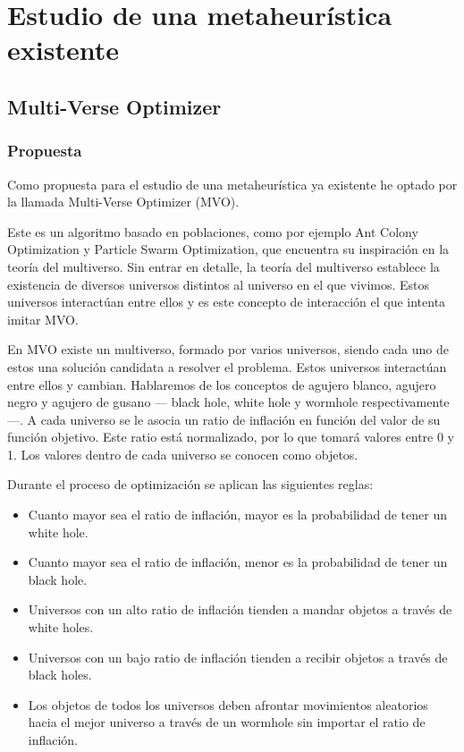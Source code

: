 \chapter{Estudio de una metaheurística existente}
\section{Multi-Verse Optimizer}
\subsection{Propuesta}
Como propuesta para el estudio de una metaheurística ya existente he optado por la llamada Multi-Verse Optimizer (MVO).

Este es un algoritmo basado en poblaciones, como por ejemplo Ant Colony Optimization y Particle Swarm Optimization, que encuentra su inspiración en la teoría del multiverso. Sin entrar en detalle, la teoría del multiverso establece la existencia de diversos universos distintos al universo en el que vivimos. Estos universos interactúan entre ellos y es este concepto de interacción el que intenta imitar MVO.

En MVO existe un multiverso, formado por varios universos, siendo cada uno de estos una solución candidata a resolver el problema. Estos universos interactúan entre ellos y cambian. Hablaremos de los conceptos de agujero blanco, agujero negro y agujero de gusano --- black hole, white hole y wormhole respectivamente---. A cada universo se le asocia un ratio de inflación en función del valor de su función objetivo. Este ratio está normalizado, por lo que tomará valores entre 0 y 1. Los valores dentro de cada universo se conocen como objetos.

Durante el proceso de optimización se aplican las siguientes reglas:
\begin{itemize}
   \item Cuanto mayor sea el ratio de inflación, mayor es la probabilidad de tener un white hole.
   \item Cuanto mayor sea el ratio de inflación, menor es la probabilidad de tener un black hole.
   \item Universos con un alto ratio de inflación tienden a mandar objetos a través de white holes.
   \item Universos con un bajo ratio de inflación tienden a recibir objetos a través de black holes.
   \item Los objetos de todos los universos deben afrontar movimientos aleatorios hacia el mejor universo a través de un wormhole sin importar el ratio de inflación.
\end{itemize}

